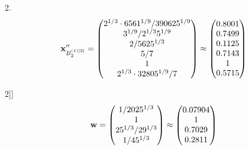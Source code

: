 \documentclass[10pt,a4paper]{article}
\begin{document}
	2.
	\[
		\bold{x}''_{B_2^{(1)[2]}} = 
		\begin{pmatrix}
			{{2^ {1 / 3}} \cdot {6561^ {1 / 9}}} / {{390625^ {1 / 9}}} \\
			{{3^ {1 / 9}}} / {{2^ {1 / 3}}{5^ {1 / 9}}} \\
			{{2}} / {{5625^ {1 / 3}}} \\
			{{5}} / {{7}} \\
			{1}{} \\
			{{2^ {1 / 3}} \cdot {32805^ {1 / 9}}} / {{7}} \\
		\end{pmatrix}
		\approx
		\begin{pmatrix}
			0.8001   \\
			0.7499   \\
			0.1125   \\
			0.7143   \\
			1        \\
			0.5715   \\
		\end{pmatrix}
	\]

2]]
	\[
		\bold{w} = 
		\begin{pmatrix}
			{1} / {{2025^ {1 / 3}}} \\
			{1}{} \\
			{{25^ {1 / 3}}} / {{2}{9^ {1 / 3}}} \\
			{1} / {{45^ {1 / 3}}} \\
		\end{pmatrix}
		\approx
		\begin{pmatrix}
			0.07904  \\
			1        \\
			0.7029   \\
			0.2811   \\
		\end{pmatrix}
	\]
\end{document}
